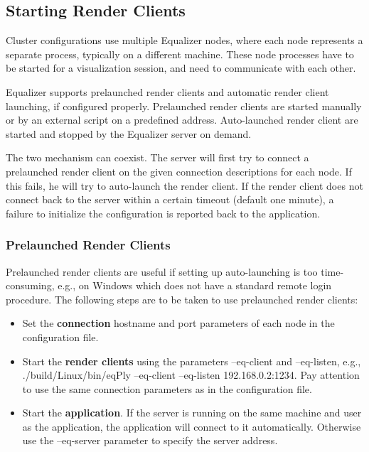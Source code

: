 \documentclass[10pt,a4]{scrartcl}
\begin{document}
\subsection{Starting Render Clients}
Cluster configurations use multiple Equalizer nodes, where each node represents
a separate process, typically on a different machine. These node processes have
to be started for a visualization session, and need to communicate with each
other.

Equalizer supports prelaunched render clients and automatic render client
launching, if configured properly. Prelaunched render clients are started
manually or by an external script on a predefined address. Auto-launched render
client are started and stopped by the Equalizer server on demand.

The two mechanism can coexist. The server will first try to connect a
prelaunched render client on the given connection descriptions for each
node. If this fails, he will try to auto-launch the render client. If the render
client does not connect back to the server within a certain timeout (default one
minute), a failure to initialize the configuration is reported back to the
application.

\subsubsection{\label{sResident}Prelaunched Render Clients}
Prelaunched render clients are useful if setting up auto-launching is too
time-consuming, e.g., on Windows which does not have a standard remote login
procedure. The following steps are to be taken to use prelaunched render
clients:

\begin{itemize}
\item Set the \textbf{connection} hostname and port parameters of each node in
  the configuration file.
\item Start the \textbf{render clients} using the parameters
  \textsf{--eq-client} and \textsf{--eq-listen}, e.g.,
  \textsf{./build/Linux/bin/eqPly --eq-client --eq-listen
  192.168.0.2:1234}. Pay attention to use the same connection parameters as in
    the configuration file.
\item Start the \textbf{application}. If the server is running on the same
  machine and user as the application, the application will connect to it
  automatically. Otherwise use the \textsf{--eq-server} parameter to specify the
  server address.
\end{itemize}
\end{document}
